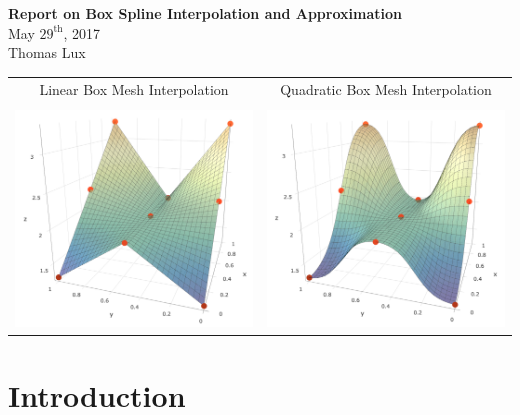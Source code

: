 \documentclass[11pt,margin=1in]{article}
\begin{document}
\begin{center}
  \textbf{Report on Box Spline Interpolation and Approximation}\\
  May $\text{29}^\text{th}$, 2017\\
  Thomas Lux
\end{center}

\begin{table}[!htbp]
\centering
\begin{tabular}{cc}

  Linear Box Mesh Interpolation & Quadratic Box Mesh Interpolation \\
  \vspace{1mm} & \\

  \includegraphics[width=7cm]{Linear_Box_Mesh} &
  \includegraphics[width=7cm]{Quadratic_Box_Mesh} 

\end{tabular}
\end{table}

\vspace{-10mm}

\section{Introduction}
\end{document}
